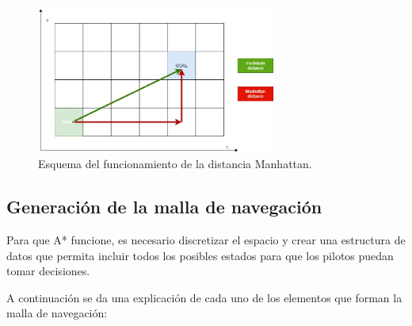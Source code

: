 \begin{figure}[H]
    \centering
    \includegraphics[width=0.7\textwidth]{imagenes/converted/Euclidean-and-Manhattan-distance-comparison-3235-Optimizations-The-first-optimization.jpg}
    \caption{Esquema del funcionamiento de la distancia Manhattan\cite{gameai}.}
    \label{fig:manhattan}
\end{figure}


\subsection{Generación de la malla de navegación}
Para que A* funcione, es necesario discretizar el espacio y crear una estructura de datos que permita incluir todos los posibles estados para que los pilotos puedan tomar decisiones.

\bigskip

A continuación se da una explicación de cada uno de los elementos que forman la malla de navegación:

